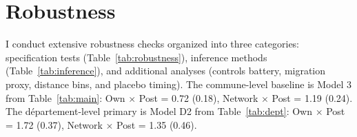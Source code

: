 \documentclass[12pt]{article}
\newcommand{\dept}{d\'{e}partement}
\begin{document}

\section{Robustness}
\label{sec:robustness}

I conduct extensive robustness checks organized into three categories: specification tests (Table~\ref{tab:robustness}), inference methods (Table~\ref{tab:inference}), and additional analyses (controls battery, migration proxy, distance bins, and placebo timing). The commune-level baseline is Model 3 from Table~\ref{tab:main}: Own $\times$ Post = 0.72 (0.18), Network $\times$ Post = 1.19 (0.24). The \dept{}-level primary is Model D2 from Table~\ref{tab:dept}: Own $\times$ Post = 1.72 (0.37), Network $\times$ Post = 1.35 (0.46).
\end{document}
